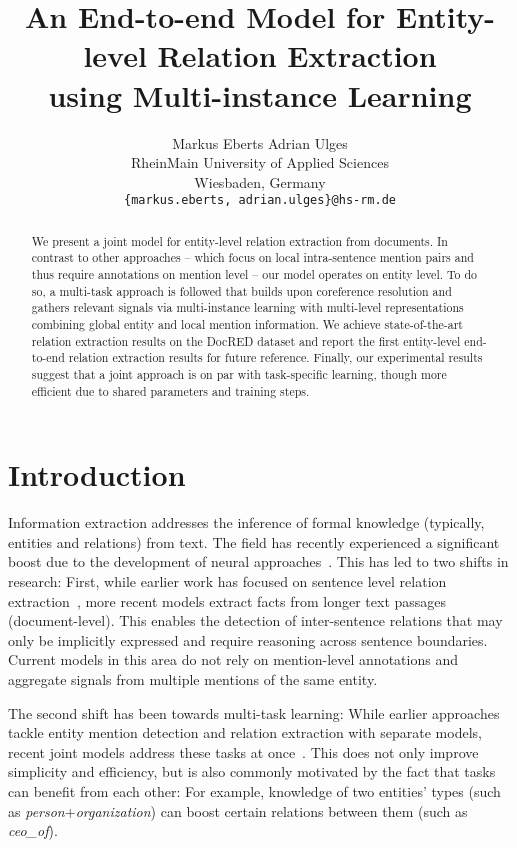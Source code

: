\documentclass[11pt,a4paper]{article}
\title{An End-to-end Model for Entity-level Relation Extraction \\ using Multi-instance Learning}
\author{Markus Eberts \hspace{1cm} Adrian Ulges\\
  RheinMain University of Applied Sciences \\
  Wiesbaden, Germany \\
  \texttt{\{markus.eberts, adrian.ulges\}@hs-rm.de}}
\date{}
\begin{document}
\maketitle
\begin{abstract}
We present a joint model for entity-level relation extraction from documents. In contrast to other approaches -- which focus on local intra-sentence mention pairs and thus require annotations on mention level -- our model operates on entity level. To do so, a multi-task approach is followed that builds upon coreference resolution and gathers relevant signals via multi-instance learning with multi-level representations combining global entity and local mention information. 
We achieve state-of-the-art relation extraction results on the DocRED dataset and report the first entity-level end-to-end relation extraction results for future reference.
Finally, our experimental results suggest that a joint approach is on par with task-specific learning, though more efficient due to shared parameters and training steps.
\end{abstract}

\section{Introduction}
Information extraction addresses the inference of formal knowledge (typically, entities and relations) from text. The field has recently experienced a significant boost due to the development of neural approaches~\cite{zeng:2014:rel_cnn, zhang:2015:rel_pos, kumar:2017:rel_survey}. This has led to two shifts in research: First, while earlier work has focused on sentence level relation extraction~\cite{hendrickx:2010:semeval,han:2018:fewrel,zhang:2017:tacred}, more recent models extract facts from longer text passages (document-level). This enables the detection of inter-sentence relations that may only be implicitly expressed and require reasoning across sentence boundaries. Current models in this area do not rely on mention-level annotations and aggregate signals from multiple mentions of the same entity. 

The second shift has been towards multi-task learning: While earlier approaches tackle entity mention detection and relation extraction with separate models, recent joint models address these tasks at once~\cite{bekoulis:2018:multi_head,nguyen:2019:biaffine_attention,wadden:2019:dygie++}. This does not only improve simplicity and efficiency, but is also commonly motivated by the fact that tasks can benefit from each other: For example, knowledge of two entities' types (such as {\it person}+{\it organization}) can boost certain relations between them (such as {\it ceo\_of}). 
\end{document}
